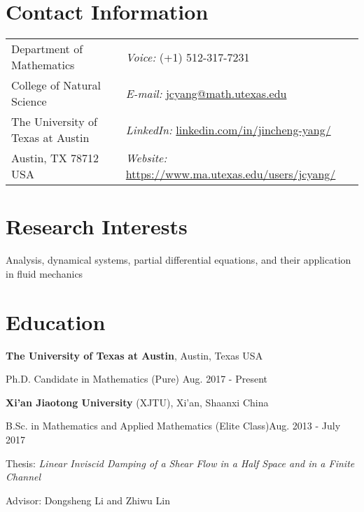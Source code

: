 \documentclass[margin,line]{res}
\newenvironment{list1}{
  \begin{list}{\ding{113}}{%
      \setlength{\itemsep}{0in}
      \setlength{\parsep}{0in} \setlength{\parskip}{0in}
      \setlength{\topsep}{0in} \setlength{\partopsep}{0in} 
      \setlength{\leftmargin}{0.17in}}}{\end{list}}
\begin{document}

\begin{resume}


\section{\sc Contact Information}
\begin{tabular}{@{}p{2.7in}p{3.05in}}        
Department of Mathematics & {\it Voice:}    (+1) 512-317-7231 \\
College of Natural Science & {\it E-mail:} \href{mailto:jcyang@math.utexas.edu}{\sf jcyang@math.utexas.edu}\\
The University of Texas at Austin & {\it LinkedIn:} \href{https://www.linkedin.com/in/jincheng-yang/}{\sf linkedin.com/in/jincheng-yang/}\\
Austin, TX 78712 USA & {\it Website:} \href{https://www.ma.utexas.edu/users/jcyang/}{\sf https://www.ma.utexas.edu/users/jcyang/}\\
\end{tabular}


\section{\sc Research Interests}
Analysis, dynamical systems, partial differential equations, and their application in fluid mechanics
\bigskip

\section{\sc Education}

{\bf The University of Texas at Austin}, Austin, Texas USA\\
\vspace*{-.1in}
\begin{list1}
\item[] Ph.D. Candidate in Mathematics (Pure) \hfill Aug. 2017 - Present
\end{list1}

{\bf Xi'an Jiaotong University} (XJTU), Xi'an, Shaanxi China\\
\vspace*{-.1in}
\begin{list1}
\item[] B.Sc. in Mathematics and Applied Mathematics (Elite Class)\hfill Aug. 2013 - July 2017
\item[] Thesis: \textit{Linear Inviscid Damping of a Shear Flow in a Half Space and in a Finite Channel}
\item[] Advisor: Dongsheng Li and Zhiwu Lin
\end{list1}


\end{resume}
\end{document}
